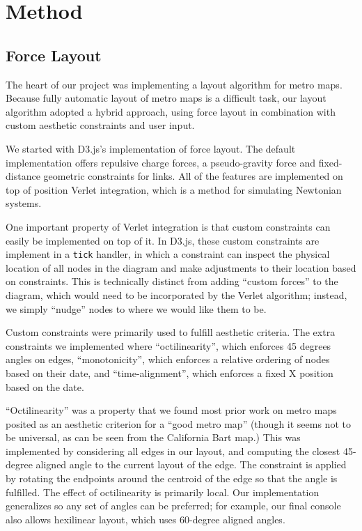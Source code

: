 \documentclass{chi2009}
\begin{document}
\section{Method}

\subsection{Force Layout}

The heart of our project was implementing a layout algorithm for metro
maps.  Because fully automatic layout of metro maps is a difficult
task, our layout algorithm adopted a hybrid approach, using force layout
in combination with custom aesthetic constraints and user input.

We started with D3.js's implementation of force layout.  The default
implementation offers repulsive charge forces, a pseudo-gravity force
and fixed-distance geometric constraints for links.  All of the features
are implemented on top of position Verlet integration, which is a method
for simulating Newtonian systems.

One important property of Verlet integration is that custom constraints can
easily be implemented on top of it.  In D3.js, these custom constraints are
implement in a \verb|tick| handler, in which a constraint can inspect the
physical location of all nodes in the diagram and make adjustments to their
location based on constraints.  This is technically distinct from adding
``custom forces'' to the diagram, which would need to be incorporated by
the Verlet algorithm; instead, we simply ``nudge'' nodes to where we would
like them to be.

Custom constraints were primarily used to fulfill aesthetic criteria.
The extra constraints we implemented where ``octilinearity'', which
enforces 45 degrees angles on edges, ``monotonicity'', which enforces a
relative ordering of nodes based on their date, and ``time-alignment'',
which enforces a fixed X position based on the date.

``Octilinearity'' was a property that we found most prior work on metro
maps posited as an aesthetic criterion for a ``good metro map'' (though
it seems not to be universal, as can be seen from the California Bart
map.)  This was implemented by considering all edges in our layout, and
computing the closest 45-degree aligned angle to the current layout of
the edge.  The constraint is applied by rotating the endpoints around
the centroid of the edge so that the angle is fulfilled.  The effect of
octilinearity is primarily local.  Our implementation generalizes so any
set of angles can be preferred; for example, our final console also
allows hexilinear layout, which uses 60-degree aligned angles.
\end{document}
